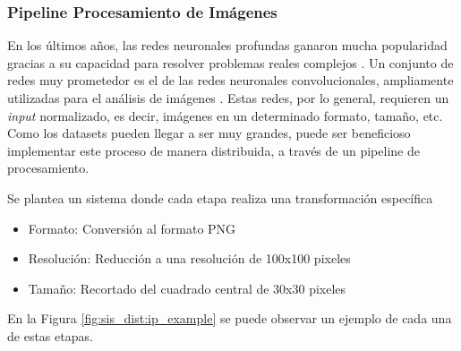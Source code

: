 \documentclass[11pt]{article}
\let\Oldsubsubsection\subsubsection
\renewcommand{\subsubsection}{\FloatBarrier\Oldsubsubsection}
\begin{document}
\subsubsection{Pipeline Procesamiento de Imágenes}

En los últimos años, las redes neuronales profundas ganaron mucha popularidad gracias a su capacidad para resolver problemas reales complejos \cite{sis_dist:dnn}. Un conjunto de redes muy prometedor es el de las redes neuronales convolucionales, ampliamente utilizadas para el análisis de imágenes \cite{sis_dist:cnn}. Estas redes, por lo general, requieren un \textit{input} normalizado, es decir, imágenes en un determinado formato, tamaño, etc. Como los datasets pueden llegar a ser muy grandes, puede ser beneficioso implementar este proceso de manera distribuida, a través de un pipeline de procesamiento.

Se plantea un sistema donde cada etapa realiza una transformación específica
\begin{itemize}
    \item Formato: Conversión al formato PNG\cite{sis_dist:png}
    \item Resolución: Reducción a una resolución de 100x100 pixeles
    \item Tamaño: Recortado del cuadrado central de 30x30 pixeles
\end{itemize}

En la Figura \ref{fig:sis_dist:ip_example} se puede observar un ejemplo de cada una de estas etapas.
\end{document}

